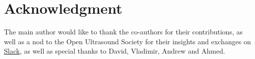 \documentclass{article}
\begin{document}
\section*{Acknowledgment}

The main author would like to thank the co-authors for their contributions, as well as a nod to the Open Ultrasound Society for their insights and exchanges on \href{https://join.slack.com/t/usdevkit/shared_invite/zt-2g501obl-z53YHyGOOMZjeCXuXzjZow}{Slack}, as well as special thanks to David, Vladimir, Andrew and Ahmed.

\clearpage



  
\end{document}
